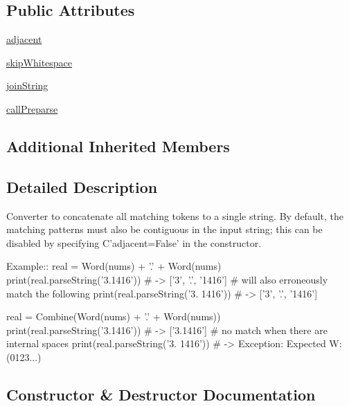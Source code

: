 \subsection*{Public Attributes}
\begin{DoxyCompactItemize}
\item 
\hyperlink{classsetuptools_1_1__vendor_1_1pyparsing_1_1Combine_af72a8e1f083c2a312c268bf1e49e0d7a}{adjacent}
\item 
\hyperlink{classsetuptools_1_1__vendor_1_1pyparsing_1_1Combine_ad6d43d8440c852d1df965a59192a2c31}{skip\+Whitespace}
\item 
\hyperlink{classsetuptools_1_1__vendor_1_1pyparsing_1_1Combine_acf8657472adde6974dc62fd9f34a337a}{join\+String}
\item 
\hyperlink{classsetuptools_1_1__vendor_1_1pyparsing_1_1Combine_a43693d7a37e335c02b6f0e82e33ad4de}{call\+Preparse}
\end{DoxyCompactItemize}
\subsection*{Additional Inherited Members}


\subsection{Detailed Description}
\begin{DoxyVerb}Converter to concatenate all matching tokens to a single string.
By default, the matching patterns must also be contiguous in the input string;
this can be disabled by specifying C{'adjacent=False'} in the constructor.

Example::
    real = Word(nums) + '.' + Word(nums)
    print(real.parseString('3.1416')) # -> ['3', '.', '1416']
    # will also erroneously match the following
    print(real.parseString('3. 1416')) # -> ['3', '.', '1416']

    real = Combine(Word(nums) + '.' + Word(nums))
    print(real.parseString('3.1416')) # -> ['3.1416']
    # no match when there are internal spaces
    print(real.parseString('3. 1416')) # -> Exception: Expected W:(0123...)
\end{DoxyVerb}
 

\subsection{Constructor \& Destructor Documentation}
\mbox{\label{classsetuptools_1_1__vendor_1_1pyparsing_1_1Combine_a6bc0f189d26a4ac6a5986cafb15641b5}} 
